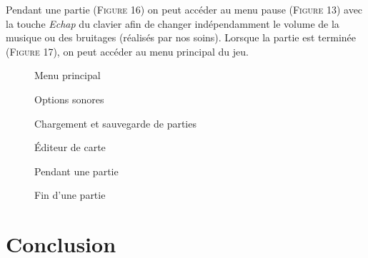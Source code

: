 \documentclass[11pt,a4paper]{article}
\begin{document}
Pendant une partie (\textsc{Figure} 16) on peut accéder au menu pause (\textsc{Figure} 13) avec la touche \textit{Echap} du clavier afin de changer indépendamment le volume de la musique ou des bruitages (réalisés par nos soins). Lorsque la partie est terminée (\textsc{Figure} 17), on peut accéder au menu principal du jeu.

\begin{figure}[H] 
 \begin{minipage}[b]{.46\linewidth}
  \centering{}
  \caption{Menu principal \label{fig:Menu}}
 \end{minipage} \hfill
 \begin{minipage}[b]{.46\linewidth}
  \centering{}
  \caption{Options sonores \label{fig:Options}}
 \end{minipage}
\end{figure}

\begin{figure}[H] 
 \begin{minipage}[b]{.46\linewidth}
  \centering{}
  \caption{Chargement et sauvegarde de parties \label{fig:Load}}
 \end{minipage} \hfill
 \begin{minipage}[b]{.46\linewidth}
  \centering{}
  \caption{Éditeur de carte \label{fig:Map}}
 \end{minipage}
\end{figure}

\begin{figure}[H] 
 \begin{minipage}[b]{.46\linewidth}
  \centering{}
  \caption{Pendant une partie \label{fig:Partie}}
 \end{minipage} \hfill
 \begin{minipage}[b]{.46\linewidth}
  \centering{}
  \caption{Fin d'une partie \label{fig:Fin}}
 \end{minipage}
\end{figure}

\newpage

\part{Conclusion}
\setcounter{section}{0}
\end{document}
